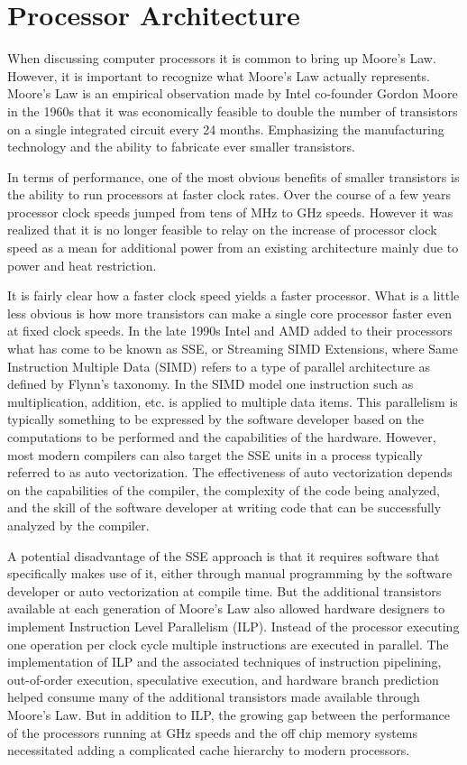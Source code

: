 \documentclass{JINST}
\begin{document}
\section{Processor Architecture}

When discussing computer processors it is common to bring up Moore's Law.  However, it is important to recognize what Moore's Law actually represents.  Moore's Law is an empirical observation made by Intel co-founder Gordon Moore in the 1960s that it was economically feasible to double the number of transistors on a single integrated circuit every 24 months.
Emphasizing   the manufacturing technology and the ability to fabricate ever smaller transistors.


In terms of performance, one of the most obvious benefits of smaller transistors is the ability to run processors at faster clock rates.  Over the course of a few years processor clock speeds jumped from tens of MHz to GHz speeds.  However it was realized that it is no longer feasible to relay 
on the increase of processor clock speed as a mean for additional power from an existing architecture mainly due to power 
and heat restriction.

It is fairly clear how a faster clock speed yields a faster processor.  What is a little less obvious is how more transistors can make a single core processor faster even at fixed clock speeds.  In the late 1990s Intel and AMD added to their processors what has come to be known as SSE, or Streaming SIMD Extensions, where Same Instruction Multiple Data (SIMD)
refers to a type of parallel architecture as defined by Flynn's taxonomy.  In the SIMD  model one instruction such as multiplication, addition, etc. is applied to multiple data items.  This parallelism is typically something to be expressed by the software developer based on the computations to be performed and the capabilities of the hardware.  However, most modern compilers can also target the SSE units in a process typically referred to as auto vectorization.  The effectiveness of auto vectorization depends on the capabilities of the compiler, the complexity of the code being analyzed, and the skill of the software developer at writing code that can be successfully analyzed by the compiler.

A potential disadvantage of the SSE approach is that it requires software that specifically makes use of it, either through manual programming by the software developer or auto vectorization at compile time.  But the additional transistors available at each generation of Moore's Law also allowed hardware designers to implement Instruction Level Parallelism (ILP).  Instead of the processor executing one operation per clock cycle multiple instructions are executed in parallel. The implementation of ILP and the associated techniques of instruction pipelining, out-of-order execution, speculative execution, and hardware branch prediction helped consume many of the additional transistors made available through Moore's Law.  But in addition to ILP, the growing gap between the performance of the processors running at GHz speeds and the off chip memory systems necessitated adding a complicated cache hierarchy to modern processors.
\end{document}
